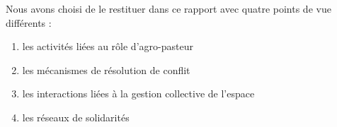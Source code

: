 Nous avons choisi de le restituer dans ce rapport avec quatre points de vue différents :
\begin{enumerate}
  \item les activités liées au rôle d'agro-pasteur
  \item les mécanismes de résolution de conflit
  \item les interactions liées à la gestion collective de l'espace
  \item les réseaux de solidarités
\end{enumerate}
